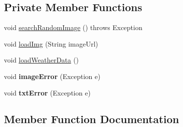 \subsection*{Private Member Functions}
\begin{DoxyCompactItemize}
\item 
void \hyperlink{classcom_1_1robobrandon_1_1simpleweather_1_1_main_activity_aa749eb4949c20efc608a0b11fa9a37f4}{search\+Random\+Image} ()  throws Exception 
\item 
void \hyperlink{classcom_1_1robobrandon_1_1simpleweather_1_1_main_activity_abdc4cd0a49c58fc47eaf041372ed331e}{load\+Img} (String image\+Url)
\item 
void \hyperlink{classcom_1_1robobrandon_1_1simpleweather_1_1_main_activity_aa63758c27d84a822f308d5508907ebcc}{load\+Weather\+Data} ()
\item 
void {\bfseries image\+Error} (Exception e)\hypertarget{classcom_1_1robobrandon_1_1simpleweather_1_1_main_activity_a0b4e8a6f728c338118174a2e7dafd5a7}{}\label{classcom_1_1robobrandon_1_1simpleweather_1_1_main_activity_a0b4e8a6f728c338118174a2e7dafd5a7}

\item 
void {\bfseries txt\+Error} (Exception e)\hypertarget{classcom_1_1robobrandon_1_1simpleweather_1_1_main_activity_a1746a82e6ba67d8cfbb077714b7b17eb}{}\label{classcom_1_1robobrandon_1_1simpleweather_1_1_main_activity_a1746a82e6ba67d8cfbb077714b7b17eb}

\end{DoxyCompactItemize}


\subsection{Member Function Documentation}
